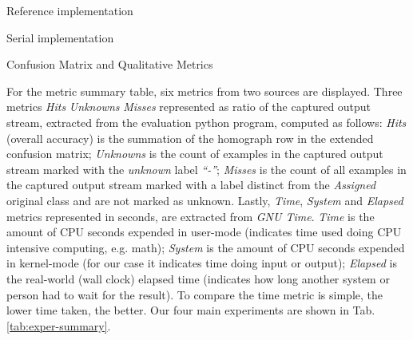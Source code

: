 %   

\begin{table}[htb]
\begin{subtable}[h]{0.9\textwidth}\begin{center}
    \caption{Reference implementation}
    
    \label{tab:java-matrix}
\end{center}\end{subtable}
\begin{subtable}[h]{0.9\textwidth}\begin{center}
    \caption{Serial implementation}
    
    \label{tab:libc-matrix}
\end{center}\end{subtable}
\caption{Confusion Matrix and Qualitative Metrics}
\label{tab:confusion-matrixes-ref-serial}
\end{table}

For the metric summary table, six metrics from two sources are displayed.
Three metrics \emph{Hits} \emph{Unknowns} \emph{Misses} represented as ratio of the
captured output stream, extracted from the evaluation python
program, computed as follows:
\emph{Hits} (overall accuracy) is the summation of the homograph row in the
extended confusion matrix;
\emph{Unknowns} is the count of examples in the captured output stream marked
with the \emph{unknown} label \emph{``-''};
\emph{Misses} is the count of all examples in the captured output stream marked
with a label distinct from the \emph{Assigned} original class and are not marked
as unknown.
Lastly, \emph{Time}, \emph{System} and \emph{Elapsed} metrics represented in seconds,
are extracted from \emph{GNU Time}.
\emph{Time} is the amount of CPU seconds expended in user-mode
(indicates time used doing CPU intensive computing, e.g. math);
\emph{System} is the amount of CPU seconds expended in kernel-mode
(for our case it indicates time doing input or output);
\emph{Elapsed} is the real-world (wall clock) elapsed time
(indicates how long another system or person had to wait for the result).
To compare the time metric is simple, the lower time taken, the better.
Our four main experiments are shown in Tab. \ref{tab:exper-summary}.


